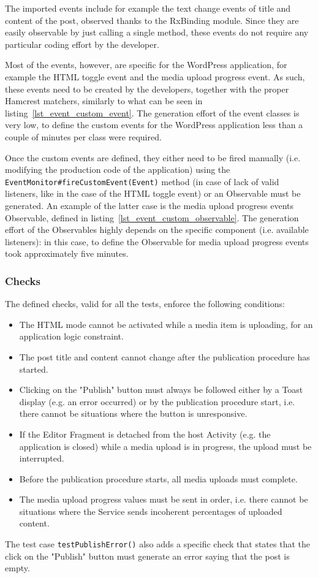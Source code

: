 \documentclass[11pt,a4paper,notitlepage]{article}
\begin{document}
The imported events include for example the text change events of title and content of the post, observed thanks to the RxBinding module. Since they are easily observable by just calling a single method, these events do not require any particular coding effort by the developer.

Most of the events, however, are specific for the WordPress application, for example the HTML toggle event and the media upload progress event. As such, these events need to be created by the developers, together with the proper Hamcrest matchers, similarly to what can be seen in listing~\ref{lst_event_custom_event}. The generation effort of the event classes is very low, to define the custom events for the WordPress application less than a couple of minutes per class were required.

Once the custom events are defined, they either need to be fired manually (i.e. modifying the production code of the application) using the \texttt{EventMonitor\#fireCustomEvent(Event)} method (in case of lack of valid listeners, like in the case of the HTML toggle event) or an Observable must be generated. An example of the latter case is the media upload progress events Observable, defined in listing~\ref{lst_event_custom_observable}. The generation effort of the Observables highly depends on the specific component (i.e. available listeners): in this case, to define the Observable for media upload progress events took approximately five minutes.

\subsubsection{Checks}
The defined checks, valid for all the tests, enforce the following conditions:
\begin{itemize}
	\item The HTML mode cannot be activated while a media item is uploading, for an application logic constraint.
	\item The post title and content cannot change after the publication procedure has started.
	\item Clicking on the "Publish" button must always be followed either by a Toast display (e.g. an error occurred) or by the publication procedure start, i.e. there cannot be situations where the button is unresponsive.
	\item If the Editor Fragment is detached from the host Activity (e.g. the application is closed) while a media upload is in progress, the upload must be interrupted.
	\item Before the publication procedure starts, all media uploads must complete.
	\item The media upload progress values must be sent in order, i.e. there cannot be situations where the Service sends incoherent percentages of uploaded content.
\end{itemize}
The test case \texttt{testPublishError()} also adds a specific check that states that the click on the "Publish" button must generate an error saying that the post is empty.
\end{document}
